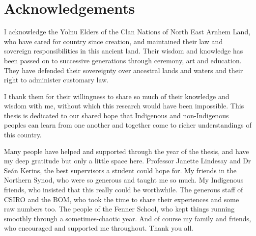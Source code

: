 \chapter{Acknowledgements}

I acknowledge the Yolnu Elders of the Clan Nations of North East Arnhem
Land, who have cared for country since creation, and maintained their
law and sovereign responsibilities in this ancient land.
Their wisdom and knowledge has been passed on to successive generations
through ceremony, art and education.  They have defended their sovereignty
over ancestral lands and waters and their right to administer customary law.

I thank them for their willingness to share so much of their knowledge
and wisdom with me, without which this research would have been impossible.
This thesis is dedicated to our shared hope that Indigenous and non-Indigenous
peoples can learn from one another and together come to richer understandings
of this country.

Many people have helped and supported through the year of the thesis,
and have my deep gratitude but only a little space here.  Professor Janette
Lindesay and Dr Seán Kerins, the best supervisors a student could hope for.
My friends in the Northern Synod, who were so generous and taught me so much.
My Indigenous friends, who insisted that this really could be worthwhile.
The generous staff of CSIRO and the BOM, who took the time to share their
experiences and some raw numbers too.  The people of the Fenner School, who
kept things running smoothly through a sometimes-chaotic year.  And of course
my family and friends, who encouraged and supported me throughout.
Thank you all.
